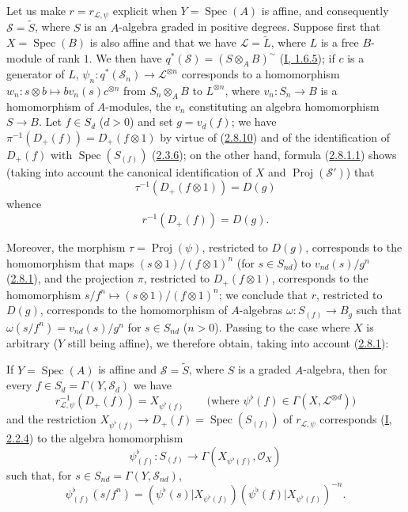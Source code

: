 \begin{env}[3.7.2]
\label{II.3.7.2}
Let us make $r=r_{\mathcal{L},\psi}$ explicit when $Y=\operatorname{Spec}(A)$ is
affine, and consequently $\mathcal{S}=\widetilde{S}$, where $S$ is an
$A$-algebra graded in positive degrees. Suppose first that
$X=\operatorname{Spec}(B)$ is also affine and that we have
$\mathcal{L}=\widetilde{L}$, where $L$ is a free
$B$-module of rank $1$. We then have
$q^*(\mathcal{S})=(S\otimes_AB)^{\sim}$
(\hyperref[I.1.6.5]{I, 1.6.5}); if $c$ is a generator of $L$,
$\psi_n:q^*(\mathcal{S}_n)\to\mathcal{L}^{\otimes n}$ corresponds to a
homomorphism
$w_n:s\otimes b\mapsto bv_n(s)c^{\otimes n}$ from $S_n\otimes_AB$ to
$L^{\otimes n}$, where $v_n:S_n\to B$ is a homomorphism of $A$-modules, the
$v_n$ constituting an algebra homomorphism $S\to B$. Let $f\in S_d$
($d>0$) and set $g=v_d(f)$; we have
$\pi^{-1}(D_+(f))=D_+(f\otimes1)$ by virtue of
(\hyperref[II.2.8.10]{2.8.10}) and of the identification of $D_+(f)$ with
$\operatorname{Spec}(S_{(f)})$ (\hyperref[II.2.3.6]{2.3.6}); on the other
hand, formula (\hyperref[II.2.8.1.1]{2.8.1.1}) shows (taking into account
the canonical identification of $X$ and $\operatorname{Proj}(\mathcal{S}')$)
that
\[
  \tau^{-1}(D_+(f\otimes1))=D(g)
\]
whence
\[
\label{II.3.7.2.1}
  r^{-1}(D_+(f))=D(g).
\tag{3.7.2.1}
\]

Moreover, the morphism $\tau=\operatorname{Proj}(\psi)$, restricted to $D(g)$,
corresponds to the homomorphism that maps
$(s\otimes1)/(f\otimes1)^n$ (for $s\in S_{nd}$) to
$v_{nd}(s)/g^n$ (\hyperref[II.2.8.1]{2.8.1}), and the projection $\pi$,
restricted to $D_+(f\otimes1)$, corresponds to the homomorphism
$s/f^n\mapsto(s\otimes1)/(f\otimes1)^n$; we conclude that $r$, restricted to
$D(g)$, corresponds to the homomorphism of $A$-algebras
$\omega:S_{(f)}\to B_g$ such that $\omega(s/f^n)=v_{nd}(s)/g^n$ for
$s\in S_{nd}$ ($n>0$). Passing to the case where $X$ is arbitrary ($Y$ still
being affine), we therefore obtain, taking into account
(\hyperref[II.2.8.1]{2.8.1}):
\end{env}

\begin{proposition}[3.7.3]
\label{II.3.7.3}
If $Y=\operatorname{Spec}(A)$ is affine and $\mathcal{S}=\widetilde{S}$, where
$S$ is a graded $A$-algebra, then for every
$f\in S_d=\Gamma(Y,\mathcal{S}_d)$ we have
\[
\label{II.3.7.3.1}
  r_{\mathcal{L},\psi}^{-1}(D_+(f))=X_{\psi^\flat(f)}
  \qquad\bigl(\text{where }\psi^\flat(f)\in
  \Gamma(X,\mathcal{L}^{\otimes d})\bigr)
\tag{3.7.3.1}
\]
and the restriction $X_{\psi^\flat(f)}\to D_+(f)=\operatorname{Spec}(S_{(f)})$
of $r_{\mathcal{L},\psi}$ corresponds
(\hyperref[I.2.2.4]{I, 2.2.4}) to the algebra homomorphism
\[
\label{II.3.7.3.2}
  \psi_{(f)}^\flat:S_{(f)}\longrightarrow
  \Gamma(X_{\psi^\flat(f)},\mathcal{O}_X)
\tag{3.7.3.2}
\]
such that, for $s\in S_{nd}=\Gamma(Y,\mathcal{S}_{nd})$,
\[
\label{II.3.7.3.3}
  \psi_{(f)}^\flat(s/f^n)
  =(\psi^\flat(s)|X_{\psi^\flat(f)})
   (\psi^\flat(f)|X_{\psi^\flat(f)})^{-n}.
\tag{3.7.3.3}
\]
\end{proposition}


